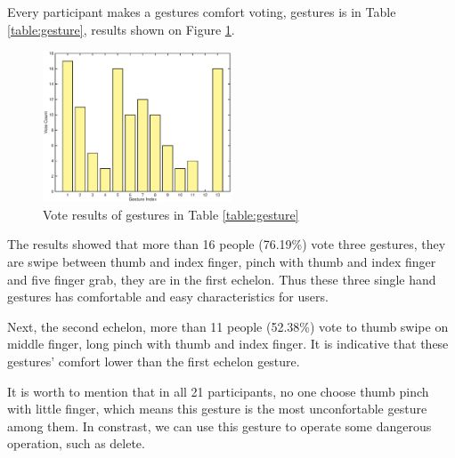 Every participant makes a gestures comfort voting, gestures is in Table \ref{table:gesture}, results shown on Figure \ref{fig:gesture-vote}.

\begin{figure}[H]
    \kaishu
    \centering
    \includegraphics[width=0.5\textwidth]{figures/gesture-vote}
    \caption{\kaishu Vote results of gestures in Table \ref{table:gesture}}
    \label{fig:gesture-vote}
\end{figure}

The results showed that more than 16 people (76.19\%) vote three gestures, they are swipe between thumb and index finger, pinch with thumb and index finger and five finger grab, they are in the first echelon. Thus these three single hand gestures has comfortable and easy characteristics for users.

Next, the second echelon, more than 11 people (52.38\%) vote to thumb swipe on middle finger, long pinch with thumb and index finger. It is indicative that these gestures' comfort lower than the first echelon gesture.

It is worth to mention that in all 21 participants, no one choose thumb pinch with little finger, which means this gesture is the most unconfortable gesture among them. In constrast, we can use this gesture to operate some dangerous operation, such as delete.

